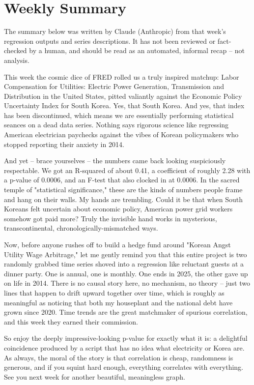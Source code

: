 \section{Weekly Summary}

\begin{tcolorbox}[colback=yellow!10,colframe=black!50,title=AI-Generated Content]
\noindent The summary below was written by Claude (Anthropic) from that week's regression outputs and series descriptions. It has not been reviewed or fact-checked by a human, and should be read as an automated, informal recap -- not analysis.
\end{tcolorbox}

This week the cosmic dice of FRED rolled us a truly inspired matchup: Labor Compensation for Utilities: Electric Power Generation, Transmission and Distribution in the United States, pitted valiantly against the Economic Policy Uncertainty Index for South Korea. Yes, that South Korea. And yes, that index has been discontinued, which means we are essentially performing statistical seances on a dead data series. Nothing says rigorous science like regressing American electrician paychecks against the vibes of Korean policymakers who stopped reporting their anxiety in 2014.

And yet -- brace yourselves -- the numbers came back looking suspiciously respectable. We got an R-squared of about 0.41, a coefficient of roughly 2.28 with a p-value of 0.0006, and an F-test that also clocked in at 0.0006. In the sacred temple of "statistical significance," these are the kinds of numbers people frame and hang on their walls. My hands are trembling. Could it be that when South Koreans felt uncertain about economic policy, American power grid workers somehow got paid more? Truly the invisible hand works in mysterious, transcontinental, chronologically-mismatched ways.

Now, before anyone rushes off to build a hedge fund around "Korean Angst Utility Wage Arbitrage," let me gently remind you that this entire project is two randomly grabbed time series shoved into a regression like reluctant guests at a dinner party. One is annual, one is monthly. One ends in 2025, the other gave up on life in 2014. There is no causal story here, no mechanism, no theory -- just two lines that happen to drift upward together over time, which is roughly as meaningful as noticing that both my houseplant and the national debt have grown since 2020. Time trends are the great matchmaker of spurious correlation, and this week they earned their commission.

So enjoy the deeply impressive-looking p-value for exactly what it is: a delightful coincidence produced by a script that has no idea what electricity or Korea are. As always, the moral of the story is that correlation is cheap, randomness is generous, and if you squint hard enough, everything correlates with everything. See you next week for another beautiful, meaningless graph.
